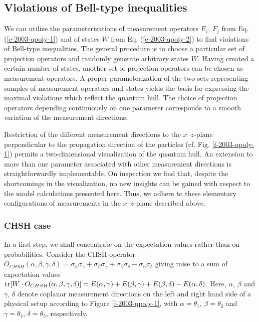 \documentclass[pra,showpacs,showkeys,amsfonts]{revtex4}
\begin{document}
\subsection{Violations of Bell-type inequalities}
We can utilize  the parameterizations of measurement operators
$E_i,\,F_j$ from Eq. (\ref{e-2003-qpoly-1})
and of states $W$ from Eq. (\ref{e-2003-qpoly-2})
to find violations of Bell-type
inequalities.
The general procedure is to choose a particular set of
projection operators and randomly generate arbitrary states $W$.
Having created a certain number of states, another set of
projection operators can be chosen as measurement operators.
A proper parameterization of the two sets representing samples of
measurement operators and states yields the basis
for expressing the maximal violations which reflect the quantum hull.
The choice of projection operators depending continuously on one
parameter corresponds to a smooth variation of the measurement
directions.

Restriction of the different measurement
directions to the $x$--$z$-plane perpendicular to the propagation direction of the particles
(cf. Fig. \ref{f-2003-qpoly-1})
permits a two-dimensional visualization of
the quantum hull.
An extension to more than one parameter associated with other measurement
directions is straightforwardly implementable.
On inspection we find that, despite the shortcomings in the visualization, no new insights
can be gained with respect to the model calculations presented here.
Thus, we adhere to these elementary
configurations of measurements in the $x$--$z$-plane described above.


\subsubsection{CHSH case}
In a first step, we shall concentrate on the expectation values
rather than on probabilities.
Consider the CHSH-operator
$
  O_{CHSH}(\alpha ,\beta ,\gamma ,\delta )=
\sigma_\alpha \sigma_\gamma + \sigma_\beta \sigma_\gamma +
  \sigma_\beta \sigma_\delta - \sigma_\alpha \sigma_\delta
$ giving raise to a sum of expectation values
$
{\rm tr}[W\cdot O_{CHSH}(\alpha ,\beta ,\gamma ,\delta )]= E(\alpha,\gamma) +
  E(\beta,\gamma) + E(\beta,\delta) - E(\alpha,\delta)$.
Here, $\alpha$, $\beta$ and $\gamma$, $\delta$ denote coplanar measurement
directions on the left and right hand side of a physical setup according to
Figure \ref{f-2003-qpoly-1}, with $\alpha = \theta_1$, $\beta=\theta_2$ and
$\gamma=\theta_4$, $\delta=\theta_5$, respectively.
\end{document}

